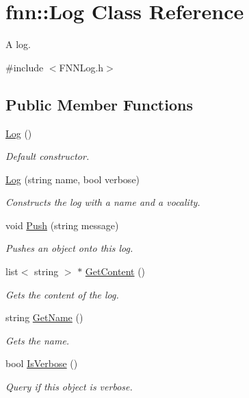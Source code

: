 \hypertarget{classfnn_1_1_log}{}\section{fnn\+:\+:Log Class Reference}
\label{classfnn_1_1_log}


A log.  




{\ttfamily \#include $<$F\+N\+N\+Log.\+h$>$}

\subsection*{Public Member Functions}
\begin{DoxyCompactItemize}
\item 
\hyperlink{classfnn_1_1_log_a28ebbb7336ed0d3d67a9f8a24003ff6d}{Log} ()
\begin{DoxyCompactList}\small\item\em Default constructor. \end{DoxyCompactList}\item 
\hyperlink{classfnn_1_1_log_a422512ecaae7eefd08bfdd17f65e1ebd}{Log} (string name, bool verbose)
\begin{DoxyCompactList}\small\item\em Constructs the log with a name and a vocality. \end{DoxyCompactList}\item 
void \hyperlink{classfnn_1_1_log_ad96391e95fa4104ce1812754b02440fb}{Push} (string message)
\begin{DoxyCompactList}\small\item\em Pushes an object onto this log. \end{DoxyCompactList}\item 
list$<$ string $>$ $\ast$ \hyperlink{classfnn_1_1_log_a51541f4a7e78514fb6bd50864fc46a6a}{Get\+Content} ()
\begin{DoxyCompactList}\small\item\em Gets the content of the log. \end{DoxyCompactList}\item 
string \hyperlink{classfnn_1_1_log_a8d5c518122277580c5b343e6b1e6eedb}{Get\+Name} ()
\begin{DoxyCompactList}\small\item\em Gets the name. \end{DoxyCompactList}\item 
bool \hyperlink{classfnn_1_1_log_a82fd415cabeff5d446affbacc4c22549}{Is\+Verbose} ()
\begin{DoxyCompactList}\small\item\em Query if this object is verbose. \end{DoxyCompactList}\end{DoxyCompactItemize}


